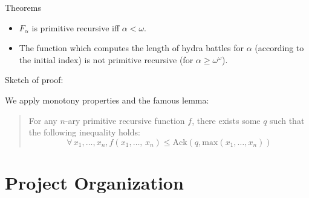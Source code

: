 \documentclass[10pt, fleqn]{beamer}
\begin{document}
\begin{frame}
  
  \begin{block}{Theorems}
    \begin{itemize}
    \item $F_\alpha$ is primitive recursive iff $\alpha<\omega$.
     \item  
    The function which computes the length of hydra battles
    for $\alpha$ (according to the initial index) is not primitive recursive
    (for $\alpha\geq \omega^\omega$).

    \end{itemize}
    
    
  
  \begin{block}{Sketch of proof:}

   We apply monotony properties and the famous lemma:
    \vspace{5pt}
    
       \begin{quote}
      {\color{mathcolor}
        For any $n$-ary primitive recursive  function $f$, 
        there exists some $q$ such that the following inequality holds:
         \[\forall\,x_1,\dots,x_n,  
          f(x_1,\dots,\,x_n)\leq\textrm{Ack}(q,\textrm{max}(x_1,\dots,x_n))\]}
    \end{quote}
  \end{block}
  
  \end{block}
\end{frame}




\begin{frame}
  \frametitle{}
  \begin{scriptsize}
  \end{scriptsize}
\end{frame}




\section{Project Organization}
\end{document}
